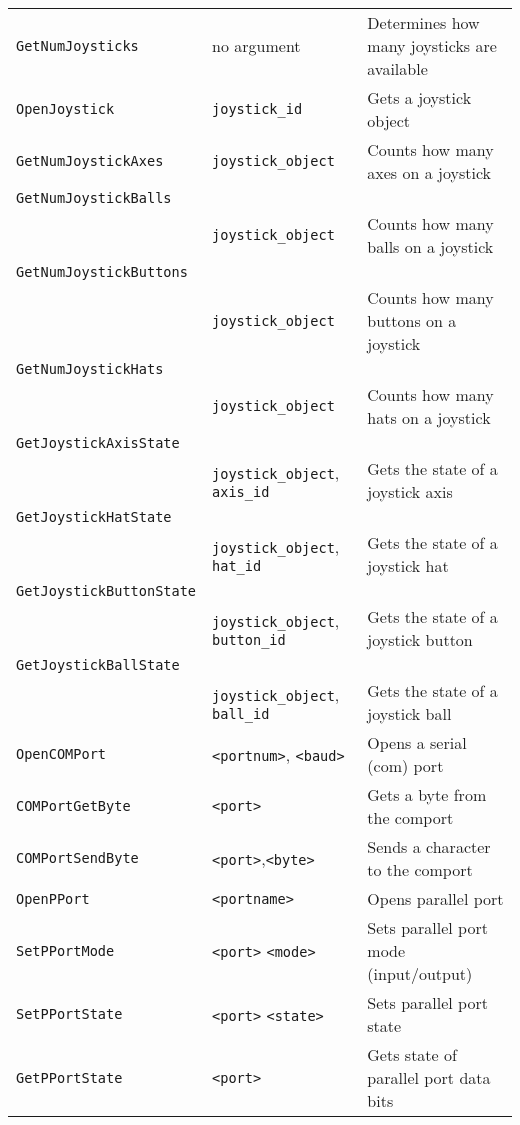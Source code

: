 \begin{longtable}{p{3cm}p{3cm}p{6cm}}
\verb+GetNumJoysticks+& no argument&Determines how many joysticks are available\\
\verb+OpenJoystick+& \verb+joystick_id+& Gets a joystick object\\
\verb+GetNumJoystickAxes+&\verb+joystick_object+&Counts how many axes on a joystick\\
\verb+GetNumJoystickBalls+\\
 &\verb+joystick_object+&Counts how many balls on a joystick\\
\verb+GetNumJoystickButtons+\\
&\verb+joystick_object+&Counts how many buttons on a joystick\\
\verb+GetNumJoystickHats+\\
&\verb+joystick_object+&Counts how many hats on a joystick\\
\verb+GetJoystickAxisState+\\
&\verb+joystick_object+, \verb+axis_id+&Gets the state of a joystick axis\\
\verb+GetJoystickHatState+\\
&\verb+joystick_object+, \verb+hat_id+&Gets the state of a joystick hat\\
\verb+GetJoystickButtonState+\\
&\verb+joystick_object+, \verb+button_id+&Gets the state of a joystick button\\
\verb+GetJoystickBallState+\\
&\verb+joystick_object+, \verb+ball_id+&Gets the state of a joystick ball\\

\verb+OpenCOMPort+    & \verb+<portnum>+, \verb+<baud>+ & Opens a serial (com) port\\
\verb+COMPortGetByte+ &\verb+<port>+                    & Gets a byte from the comport\\
\verb+COMPortSendByte+  &\verb+<port>+,\verb+<byte>+   & Sends a character to the comport\\


\verb+OpenPPort+     & \verb+<portname>+ & Opens parallel port\\
\verb+SetPPortMode+  & \verb+<port>+ \verb+<mode>+& Sets parallel port mode (input/output)\\
\verb+SetPPortState+ & \verb+<port>+ \verb+<state>+& Sets parallel port state\\
\verb+GetPPortState+ & \verb+<port>+ & Gets state of parallel port data bits\\


\end{longtable}
